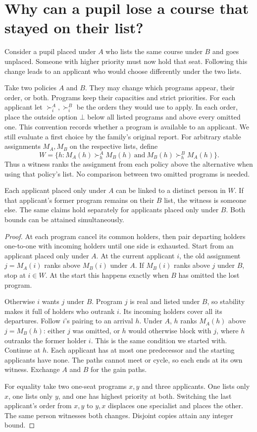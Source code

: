 \section{Why can a pupil lose a course that stayed on their list?}\label{sec:order-certificate}
Consider a pupil placed under $A$ who lists the same course under $B$ and goes unplaced. Someone with higher priority must now hold that seat. Following this change leads to an applicant who would choose differently under the two lists.

Take two policies $A$ and $B$. They may change which programs appear, their order, or both. Programs keep their capacities and strict priorities. For each applicant let $\succ_i^A,\succ_i^B$ be the orders they would use to apply. In each order, place the outside option $\bot$ below all listed programs and above every omitted one. This convention records whether a program is available to an applicant. We still evaluate a first choice by the family's original report. For arbitrary stable assignments $M_A,M_B$ on the respective lists, define
\[
 W=\{h:M_A(h)\succ_h^A M_B(h)\ \text{and}\ M_B(h)\succ_h^B M_A(h)\}.
\]
Thus a witness ranks the assignment from each policy above the alternative when using that policy's list. No comparison between two omitted programs is needed.

\begin{theorem}\label{thm:order-witness}
Each applicant placed only under $A$ can be linked to a distinct person in $W$. If that applicant's former program remains on their $B$ list, the witness is someone else. The same claims hold separately for applicants placed only under $B$. Both bounds can be attained simultaneously.
\end{theorem}
\begin{proof}
At each program cancel its common holders, then pair departing holders one-to-one with incoming holders until one side is exhausted. Start from an applicant placed only under $A$. At the current applicant $i$, the old assignment $j=M_A(i)$ ranks above $M_B(i)$ under $A$. If $M_B(i)$ ranks above $j$ under $B$, stop at $i\in W$. At the start this happens exactly when $B$ has omitted the lost program.

Otherwise $i$ wants $j$ under $B$. Program $j$ is real and listed under $B$, so stability makes it full of holders who outrank $i$. Its incoming holders cover all its departures. Follow $i$'s pairing to an arrival $h$. Under $A$, $h$ ranks $M_A(h)$ above $j=M_B(h)$: either $j$ was omitted, or $h$ would otherwise block with $j$, where $h$ outranks the former holder $i$. This is the same condition we started with. Continue at $h$. Each applicant has at most one predecessor and the starting applicants have none. The paths cannot meet or cycle, so each ends at its own witness. Exchange $A$ and $B$ for the gain paths.

For equality take two one-seat programs $x,y$ and three applicants. One lists only $x$, one lists only $y$, and one has highest priority at both. Switching the last applicant's order from $x,y$ to $y,x$ displaces one specialist and places the other. The same person witnesses both changes. Disjoint copies attain any integer bound.
\end{proof}

